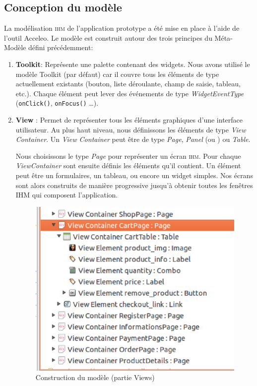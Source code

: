 \subsection{Conception du modèle}
La modélisation \textsc{ihm} de l'application prototype \kwplay{} a été mise en place à l'aide de l'outil Acceleo. Le modèle est construit autour des trois principes du Méta-Modèle défini précédemment:
\begin{enumerate}
\item \textbf{Toolkit}: Représente une palette contenant des widgets. Nous avons utilisé le modèle Toolkit (par défaut) car il couvre tous les éléments de type   actuellement existants (bouton, liste déroulante, champ de saisie, tableau, etc.). Chaque élément  peut lever des événements de type \textit{WidgetEventType} (\verb+onClick()+, \verb+onFocus()+ \dots). 

\item \textbf{View} : Permet de représenter tous les éléments graphiques d'une interface utilisateur. Au plus haut niveau, nous définissons les éléments de type \textit{View Container}. Un \textit{View Container} peut être de type \textit{Page}, \textit{Panel} (ou ) ou \textit{Table}. 

Nous choisissons le type \textit{Page} pour représenter un écran \textsc{ihm}. Pour chaque \textit{ViewContainer} sont ensuite définis les éléments qu'il contient. Un élément peut être un formulaires, un tableau, ou encore un widget simples. Nos écrans sont alors construits de manière progressive jusqu'à obtenir toutes les fenêtres \textsc{IHM} qui composent l'application.
\begin{figure}[H]
  \centering
  \includegraphics[scale=.4]{img/views.eps}
  \caption{Construction du modèle (partie Views)}
  \label{fig:view}
\end{figure}


\end{enumerate}
